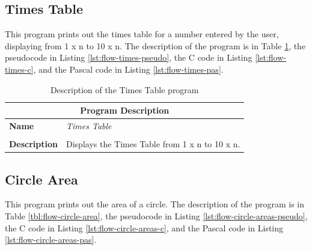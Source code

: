 \subsection{Times Table} %
\label{sub:times_table_flow}

This program prints out the times table for a number entered by the user, displaying from 1 x n to 10 x n. The description of the program is in Table \ref{tbl:flow-times-table}, the pseudocode in Listing \ref{lst:flow-times-pseudo}, the C code in Listing \ref{lst:flow-times-c}, and the Pascal code in Listing \ref{lst:flow-times-pas}.

\begin{table}[h]
\centering
\begin{tabular}{l|p{10cm}}
  \hline
  \multicolumn{2}{c}{\textbf{Program Description}} \\
  \hline
  \textbf{Name} & \emph{Times Table} \\
  \\
  \textbf{Description} & Displays the Times Table from 1 x n to 10 x n. \\
  \hline
\end{tabular}
\caption{Description of the Times Table program}
\label{tbl:flow-times-table}
\end{table}



\clearpage




\clearpage
\subsection{Circle Area} %
\label{sub:circle_area_control_flow}

This program prints out the area of a circle. The description of the program is in Table \ref{tbl:flow-circle-area}, the pseudocode in Listing \ref{lst:flow-circle-areas-pseudo}, the C code in Listing \ref{lst:flow-circle-areas-c}, and the Pascal code in Listing \ref{lst:flow-circle-areas-pas}.

